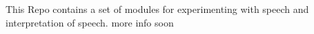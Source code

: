 This Repo contains a set of modules for experimenting with speech and interpretation of speech. more info soon 